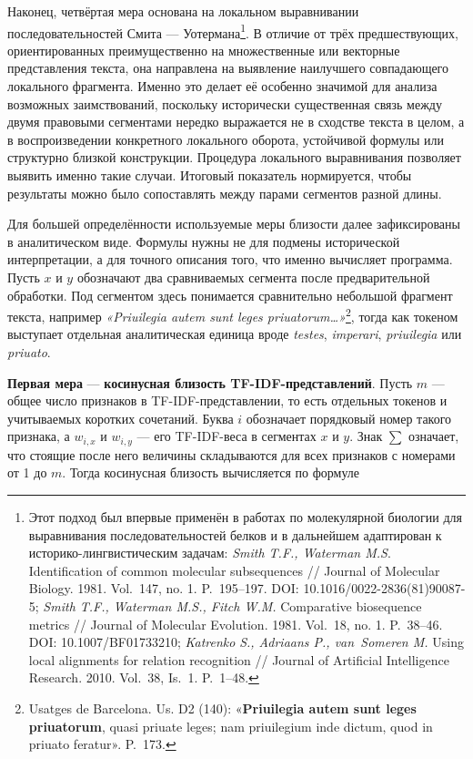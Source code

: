 Наконец, четвёртая мера основана на локальном выравнивании последовательностей Смита --- Уотермана\footnote{Этот подход был впервые применён в работах по молекулярной биологии для выравнивания последовательностей белков и в дальнейшем адаптирован к историко-лингвистическим задачам: \emph{Smith T.F., Waterman M.S}. Identification of common molecular subsequences // Journal of Molecular Biology. 1981. Vol.~147, no. 1. P.~195--197. DOI: 10.1016/0022-2836(81)90087-5; \emph{Smith T.F., Waterman M.S., Fitch W.M. }Comparative biosequence metrics // Journal of Molecular Evolution. 1981. Vol.~18, no. 1. P.~38--46. DOI: 10.1007/BF01733210;\emph{ }\emph{Katrenko}\emph{ S., Adriaans P., van~Someren M. }Using local alignments for relation recognition // Journal of Artificial Intelligence Research. 2010. Vol.~38, Is.~1. P.~1--48.}. В отличие от трёх предшествующих, ориентированных преимущественно на множественные или векторные представления текста, она направлена на выявление наилучшего совпадающего локального фрагмента. Именно это делает её особенно значимой для анализа возможных заимствований, поскольку исторически существенная связь между двумя правовыми сегментами нередко выражается не в сходстве текста в целом, а в воспроизведении конкретного локального оборота, устойчивой формулы или структурно близкой конструкции. Процедура локального выравнивания позволяет выявить именно такие случаи. Итоговый показатель нормируется, чтобы результаты можно было сопоставлять между парами сегментов разной длины.

Для большей определённости используемые меры близости далее зафиксированы в аналитическом виде. Формулы нужны не для подмены исторической интерпретации, а для точного описания того, что именно вычисляет программа. Пусть $x$ и $y$ обозначают два сравниваемых сегмента после предварительной обработки. Под сегментом здесь понимается сравнительно небольшой фрагмент текста, например \emph{«Priuilegia autem sunt leges priuatorum…»}\footnote{Usatges de Barcelona. Us. D2 (140): «\textbf{Priuilegia autem sunt leges priuatorum}, quasi priuate leges; nam priuilegium inde dictum, quod in priuato feratur». P.~173.}, тогда как токеном выступает отдельная аналитическая единица вроде \emph{testes}, \emph{imperari}, \emph{priuilegia} или \emph{priuato}.

\textbf{Первая мера} --- \textbf{косинусная близость TF-IDF-представлений}. Пусть $m$ --- общее число признаков в TF-IDF-представлении, то есть отдельных токенов и учитываемых коротких сочетаний. Буква $i$ обозначает порядковый номер такого признака, а $w_{i,x}$ и $w_{i,y}$ --- его TF-IDF-веса в сегментах $x$ и $y$. Знак $\sum$ означает, что стоящие после него величины складываются для всех признаков с номерами от 1 до $m$. Тогда косинусная близость вычисляется по формуле

